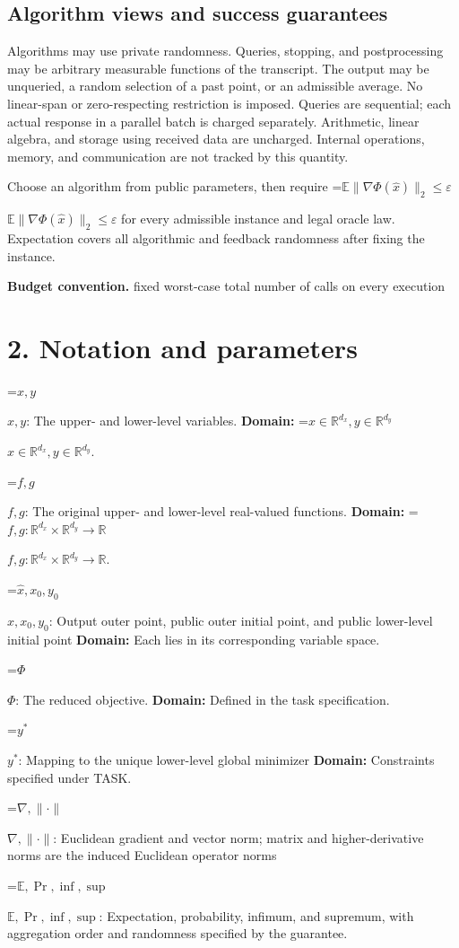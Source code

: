 \documentclass[10pt,a4paper]{article}
\newcommand{\AtlasMath}[1]{\par\begingroup\centering\setbox0=\hbox{$\displaystyle #1$}\ifdim\wd0>1.4\linewidth\typeout{ATLAS WIDE FORMULA: \the\wd0}\fi\ifdim\wd0>\linewidth\resizebox{\linewidth}{!}{\box0}\else\box0\fi\par\endgroup}
\newcommand{\AtlasInlineMath}[1]{\begingroup\setbox0=\hbox{$#1$}\ifdim\wd0>.4\linewidth\endgroup\AtlasMath{#1}\else\endgroup$#1$\fi}
\begin{document}
\subsection{Algorithm views and success guarantees}
Algorithms may use private randomness. Queries, stopping, and postprocessing may be arbitrary measurable functions of the transcript. The output may be unqueried, a random selection of a past point, or an admissible average. No linear-span or zero-respecting restriction is imposed. Queries are sequential; each actual response in a parallel batch is charged separately. Arithmetic, linear algebra, and storage using received data are uncharged. Internal operations, memory, and communication are not tracked by this quantity.

Choose an algorithm from public parameters, then require \AtlasInlineMath{\mathbb{E}\|\nabla\Phi(\widehat{x})\|_2\le\varepsilon} for every admissible instance and legal oracle law. Expectation covers all algorithmic and feedback randomness after fixing the instance.

\textbf{Budget convention.} fixed worst-case total number of calls on every execution

\section{2. Notation and parameters}
\AtlasInlineMath{x,y}: The upper- and lower-level variables. \textbf{Domain:} \AtlasInlineMath{x\in\mathbb R^{d_x},y\in\mathbb R^{d_y}}.

\AtlasInlineMath{f,g}: The original upper- and lower-level real-valued functions. \textbf{Domain:} \AtlasInlineMath{f,g:\mathbb R^{d_x}\times\mathbb R^{d_y}\to\mathbb R}.

\AtlasInlineMath{\widehat x,x_0,y_0}: Output outer point, public outer initial point, and public lower-level initial point \textbf{Domain:} Each lies in its corresponding variable space.

\AtlasInlineMath{\Phi}: The reduced objective. \textbf{Domain:} Defined in the task specification.

\AtlasInlineMath{y^*}: Mapping to the unique lower-level global minimizer \textbf{Domain:} Constraints specified under TASK.

\AtlasInlineMath{\nabla,\|\cdot\|}: Euclidean gradient and vector norm; matrix and higher-derivative norms are the induced Euclidean operator norms

\AtlasInlineMath{\mathbb E,\Pr,\inf,\sup}: Expectation, probability, infimum, and supremum, with aggregation order and randomness specified by the guarantee.
\end{document}
